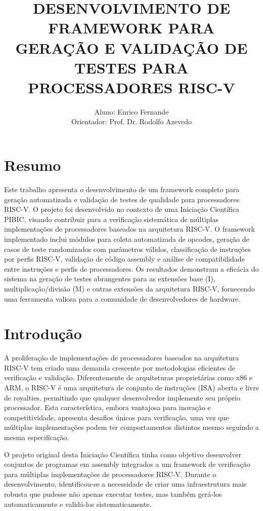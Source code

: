 \documentclass[12pt,a4paper]{article}
\title{\textbf{DESENVOLVIMENTO DE FRAMEWORK PARA GERAÇÃO E VALIDAÇÃO DE TESTES PARA PROCESSADORES RISC-V}}
\author{
    Aluno: Enrico Fernande \\
    Orientador: Prof. Dr. Rodolfo Azevedo
}
\date{}
\begin{document}
\maketitle

\section{Resumo}

Este trabalho apresenta o desenvolvimento de um framework completo para geração automatizada e validação de testes de qualidade para processadores RISC-V. O projeto foi desenvolvido no contexto de uma Iniciação Científica PIBIC, visando contribuir para a verificação sistemática de múltiplas implementações de processadores baseados na arquitetura RISC-V. O framework implementado inclui módulos para coleta automatizada de opcodes, geração de casos de teste randomizados com parâmetros válidos, classificação de instruções por perfis RISC-V, validação de código assembly e análise de compatibilidade entre instruções e perfis de processadores. Os resultados demonstram a eficácia do sistema na geração de testes abrangentes para as extensões base (I), multiplicação/divisão (M) e outras extensões da arquitetura RISC-V, fornecendo uma ferramenta valiosa para a comunidade de desenvolvedores de hardware.

\section{Introdução}

A proliferação de implementações de processadores baseados na arquitetura RISC-V tem criado uma demanda crescente por metodologias eficientes de verificação e validação. Diferentemente de arquiteturas proprietárias como x86 e ARM, o RISC-V é uma arquitetura de conjunto de instruções (ISA) aberta e livre de royalties, permitindo que qualquer desenvolvedor implemente seu próprio processador. Esta característica, embora vantajosa para inovação e competitividade, apresenta desafios únicos para verificação, uma vez que múltiplas implementações podem ter comportamentos distintos mesmo seguindo a mesma especificação.

O projeto original desta Iniciação Científica tinha como objetivo desenvolver conjuntos de programas em assembly integrados a um framework de verificação para múltiplas implementações de processadores RISC-V. Durante o desenvolvimento, identificou-se a necessidade de criar uma infraestrutura mais robusta que pudesse não apenas executar testes, mas também gerá-los automaticamente e validá-los sistematicamente.
\end{document}
